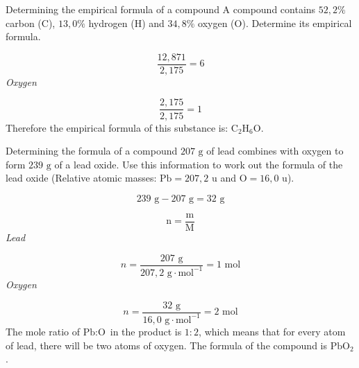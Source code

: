 \begin{wex}{Determining the empirical formula of a compound }{
A compound contains $52,2\%$ carbon ($\text{C}$), $13,0\%$ hydrogen ($\text{H}$) and $34,8\%$ oxygen ($\text{O}$). Determine its empirical formula.      
}
{      \label{m38712*id281223}\nopagebreak\noindent{}
        
    \begin{equation*}
    \frac{12,871}{2,175}=6
      \end{equation*}
      \label{m38712*id281254}
        \textsl{Oxygen}
      
      \label{m38712*id281261}\nopagebreak\noindent{}
        
    \begin{equation*}
    \frac{2,175}{2,175}=1
      \end{equation*}
      \label{m38712*id281292}Therefore the empirical formula of this substance is: ${\text{C}}_{2}{\text{H}}_{6}\text{O}$.
}
    \end{wex}
    \noindent
\label{m38712*secfhsst!!!underscore!!!id1235}
      \noindent
      \begin{wex}{Determining the formula of a compound }{
$207 \text{ g}$ of lead combines with oxygen to form $239 \text{ g}$ of a lead oxide. Use this information to work out the formula of the lead oxide (Relative atomic masses: $\text{Pb}=207,2 \text{ u}$ and $\text{O} = 16,0 \text{ u}$).
}
{
      \label{m38712*id281379}\nopagebreak\noindent{}
    \begin{equation*}
    239 \text{ g}-207 \text{ g}=32 \text{ g}
      \end{equation*}
      \label{m38712*id281407}\nopagebreak\noindent{}
        
    \begin{equation*}
    \text{n}=\frac{\text{m}}{\text{M}}
      \end{equation*}
      \label{m38712*id281427}
        \textsl{Lead}
       
      \label{m38712*id281433}\nopagebreak\noindent{}
        
    \begin{equation*}
    n = \frac{207 \text{ g}}{207,2 \text{ g} \cdot \text{mol}^{-1}}=1 \text{ mol}
      \end{equation*}
      \label{m38712*id281460}
        \textsl{Oxygen}
    
      \label{m38712*id281467}\nopagebreak\noindent{}
        
    \begin{equation*}
    n= \frac{32 \text{ g}}{16,0 \text{ g} \cdot \text{mol}^{-1}}=2 \text{ mol}
      \end{equation*}
      \label{m38712*id281498}The mole ratio of $\text{Pb}:\text{O}$ in the product is $1:2$, which means that for every atom of lead, there will be two atoms of oxygen. The formula of the compound is $\text{PbO}{}_{2}$. 
}
    \end{wex}
